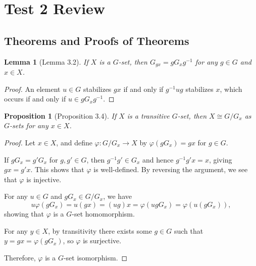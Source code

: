 \documentclass[titlepage]{article}
\theoremstyle{plain}
\newtheorem{lemma}[theorem]{Lemma}
\newtheorem{proposition}[theorem]{Proposition}
\theoremstyle{definition}
\theoremstyle{remark}
\theoremstyle{exercise-style}
\numberwithin{equation}{section}
\numberwithin{theorem}{section}
\numberwithin{remark}{section}
\begin{document}


\section{Test 2 Review}

\subsection{Theorems and Proofs of Theorems}

\begin{myboxg}
    \begin{lemma}[Lemma 3.2]
        If $X$ is a $G$-set, then $G_{gx} = g G_x g^{-1}$ for any $g \in G$ and $x \in X$.
    \end{lemma}
\end{myboxg}

\begin{proof}
    An element $u \in G$ stabilizes $gx$ if and only if $g^{-1} u g$ stabilizes $x$, 
    which occurs if and only if $u \in g G_x g^{-1}$.
\end{proof}

\begin{myboxg}
    \begin{proposition}[Proposition 3.4]
        If $X$ is a transitive $G$-set, then $X \cong G / G_x$ as $G$-sets for any $x \in X$.
    \end{proposition}
\end{myboxg}

\begin{proof}
    Let $x \in X$, and define $\varphi : G / G_x \to X$ by $\varphi(gG_x) = gx$ for $g \in G$.  
    
    If $gG_x = g'G_x$ for $g, g' \in G$, then $g^{-1}g' \in G_x$ and hence
    $g^{-1}g' x = x$, giving $gx = g'x$. This shows that $\varphi$ is well-defined.  
    By reversing the argument, we see that $\varphi$ is injective.
    
    For any $u \in G$ and $gG_x \in G / G_x$, we have
    \[
    u \varphi(gG_x) = u(gx) = (ug)x = \varphi(ugG_x) = \varphi(u(gG_x)),
    \]
    showing that $\varphi$ is a $G$-set homomorphism.
    
    For any $y \in X$, by transitivity there exists some $g \in G$ such that
    $y = gx = \varphi(gG_x)$, so $\varphi$ is surjective.
    
    Therefore, $\varphi$ is a $G$-set isomorphism.
\end{proof}
\end{document}
